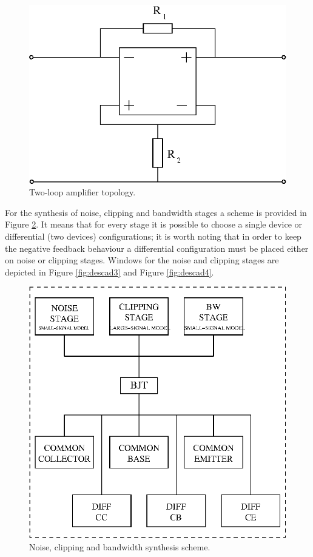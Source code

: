 \documentclass[twocolumn]{IEEEtran}
\begin{document}
\begin{figure}[hbtp]
	\centering
	\includegraphics[scale=0.5]{figuras/twoloop_basica.eps}
	\caption{Two-loop amplifier topology.}
	\label{fig:two_loop}
\end{figure}

For the synthesis of noise, clipping and bandwidth stages a scheme is provided in Figure \ref{fig:descad2}. It means that for every stage it is possible to choose a single device or differential (two devices) configurations; it is worth noting that in order to keep the negative feedback behaviour a differential configuration must be placed either on noise or clipping stages. Windows for the noise and clipping stages are depicted in Figure \ref{fig:descad3} and Figure \ref{fig:descad4}.

\begin{figure}[hbtp]
	\centering
	\includegraphics[scale=0.5]{figuras/descad2.eps}
	\caption{Noise, clipping and bandwidth synthesis scheme.}
	\label{fig:descad2}
\end{figure}
\end{document}
